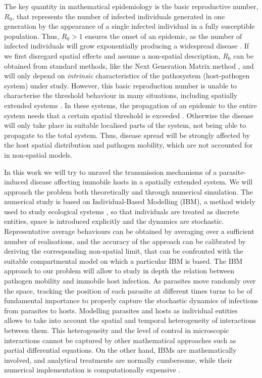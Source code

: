 The key quantity in mathematical epidemiology is the basic reproductive number,
$R_0$, that represents the number of infected individuals generated in one
generation by the appearance of a single infected individual in a fully
susceptible population. Thus, $R_0>1$ ensures the onset of an epidemic, as the
number of infected individuals will grow exponentially	producing a widespread
disease \cite{Anderson1991}. If we first disregard spatial effects and assume a
non-spatial description, $R_0$ can be obtained from standard methods, like the
Next Generation Matrix method \cite{Diekmann2010}, and will only depend on
\textit{intrinsic} characteristics of the pathosystem (host-pathogen system)
under study. However, this basic reproduction number is unable to characterise
the threshold behaviour in many situations, including spatially extended
systems \cite{Cross2007, Li2011, RILEY201568}. In these systems, the
propagation of an epidemic to the entire system needs that a certain spatial
threshold is exceeded \cite{Gilligan2008}. Otherwise the disease will only take
place in suitable localised parts of the system, not being able to propagate to
the total system. Thus, disease spread will be strongly affected by the host
spatial distribution and pathogen mobility, which are not accounted for in
non-spatial models.

In this work we will try to unravel the transmission mechanisms of a
parasite-induced disease affecting immobile hosts in a spatially extended
system. We will approach the problem both theoretically and through numerical
simulation. The numerical study is based on Individual-Based Modelling (IBM), a
method widely used to study ecological systems \cite{Grimm2005}, so that
individuals are treated as discrete entities, space is introduced explicitly
and the dynamics are stochastic. Representative average behaviours can be
obtained by averaging over a sufficient number of realisations, and the
accuracy of the approach can be calibrated by deriving the corresponding
non-spatial limit, that can be confronted with the suitable compartmental model
on which a particular IBM is based. The IBM approach to our problem will allow
to study in depth the relation between pathogen mobility and immobile host
infection. As parasites move randomly over the space, tracking the position of
each parasite at different times turns to be of fundamental importance to
properly capture the stochastic dynamics of infections from parasites to hosts.
Modelling parasites and hosts as individual entities allows to take into
account the spatial and temporal heterogeneity of interactions between them.
This heterogeneity and the level of control in microscopic interactions cannot
be captured by other mathematical approaches such as partial differential
equations. On the other hand, IBMs are mathematically involved, and analytical
treatments are normally cumbersome, while their numerical implementation is
computationally expensive \cite{Breckling1900}.

